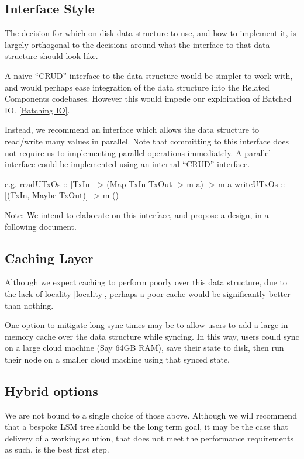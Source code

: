 \documentclass[11pt,a4paper]{article}
\begin{document}
\subsection{Interface Style}

The decision for which on disk data structure to use, and how to implement it,
is largely orthogonal to the decisions around what the interface to that data
structure should look like.

A naive ``CRUD'' interface to the data structure would be simpler to work with,
and would perhaps ease integration of the data structure into the Related Components
codebases. However this would impede our exploitation of Batched IO. \ref{Batching IO}.

Instead, we recommend an interface which allows the data structure to read/write
many values in parallel. Note that committing to this interface does not require
us to implementing parallel operations immediately. A parallel interface could
be implemented using an internal ``CRUD'' interface.

e.g.
readUTxOs :: [TxIn] -> (Map TxIn TxOut -> m a) -> m a
writeUTxOs :: [(TxIn, Maybe TxOut)] -> m ()


Note: We intend to elaborate on this interface, and propose a design, in a
following document.

\subsection{Caching Layer}
\label{Caching Layer}

Although we expect caching to perform poorly over this data structure, due to the
lack of locality \ref{locality}, perhaps a poor cache would be significantly
better than nothing.

One option to mitigate long sync times may be to allow users to add a large
in-memory cache over the data structure while syncing. In this way, users could
sync on a large cloud machine (Say 64GB RAM), save their state to disk, then run
their node on a smaller cloud machine using that synced state.


\subsection{Hybrid options}

We are not bound to a single choice of those above. Although we will recommend that
a bespoke LSM tree should be the long term goal, it may be the case that delivery of a
working solution, that does not meet the performance requirements as such, is
the best first step.
\end{document}
